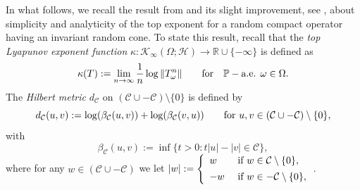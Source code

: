 \documentclass[pdflatex,sn-mathphys-num]{sn-jnl}%
\theoremstyle{thmstyleone}%
\theoremstyle{thmstyletwo}%
\theoremstyle{thmstylethree}%
\newcommand{\R}{\mathbb{R}}
\newcommand{\mP}{\mathbb{P}}
\newcommand{\cK}{\mathcal{K}}
\newcommand{\cC}{\mathcal{C}}
\numberwithin{equation}{section}
\begin{document}
%
%
%
%
%
In what follows, we recall the result from \cite{Dubois} and its slight improvement, see \cite[Theorem 8]{Doan17}, about simplicity and analyticity of the top exponent for a random compact operator having an invariant random cone. To state this result, recall that the \emph{top Lyapunov exponent function} $\kappa: \cK_{\infty}(\Omega;\mathcal H)\rightarrow \R\cup\{-\infty\}$ is defined as 
\begin{equation}\label{TopLyapunovExponent}
\kappa(T):=\lim_{n\to\infty}\frac{1}{n}\log\|T_{\omega}^n\|\qquad\hbox{for}\quad  \mP-\hbox{a.e. } \omega\in\Omega.
\end{equation}
%
%
%
The \emph{Hilbert metric} $d_{\mathcal C}$ on $\left(\mathcal C\cup -\mathcal C\right)\setminus\{0\}$ is defined by
\begin{equation}\label{HilbertMetric}
d_{\mathcal C}(u,v):=\log (\beta_{\mathcal C}(u,v))+\log (\beta_{\mathcal C}(v,u))\qquad\hbox{for } u,v\in \left(\mathcal C\cup -\mathcal C\right)\setminus\{0\},
\end{equation}
with
\begin{equation}\label{Distancebeta}
\beta_{\mathcal C}(u,v):=\inf\{t>0: t|u|-|v|\in\mathcal C\},
\end{equation}
where for any $w\in (\cC\cup -\cC)$ we let $|w|:=
\left\{
\begin{array}{ll}
    w & \hbox{ if } w\in \cC\setminus\{0\}, \\[1ex]
    -w &  \hbox{ if } w\in -\cC \setminus\{0\},
\end{array}
\right.
$.
%
%
\end{document}
